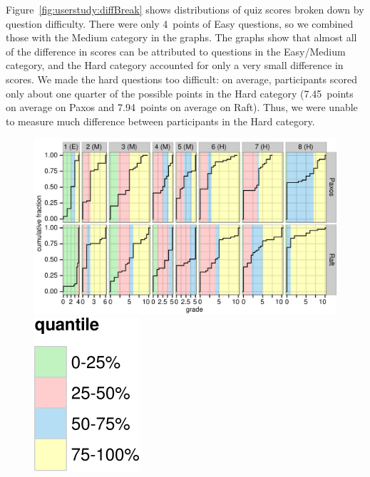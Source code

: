 Figure~\ref{fig:userstudy:diffBreak} shows distributions of quiz scores broken
down by question difficulty. There were only \SI{4}{points} of Easy questions,
so we combined those with the Medium category in the graphs.
The graphs show that almost all of the difference
in scores can be attributed to questions in the Easy/Medium category,
and the Hard category accounted for only a very small difference in
scores. We made the hard questions too difficult: on average,
participants scored only about one quarter of the possible points in the
Hard category (\SI{7.45}{points} on average on Paxos and
\SI{7.94}{points} on
average on Raft). Thus, we were unable to measure much difference
between participants in the Hard category.

\begin{figure}
\centering
{
\includegraphics{userstudy/breakdown}
\vspace{-1ex}\\
\includegraphics{userstudy/breakdownlegend}
}
\end{figure}
